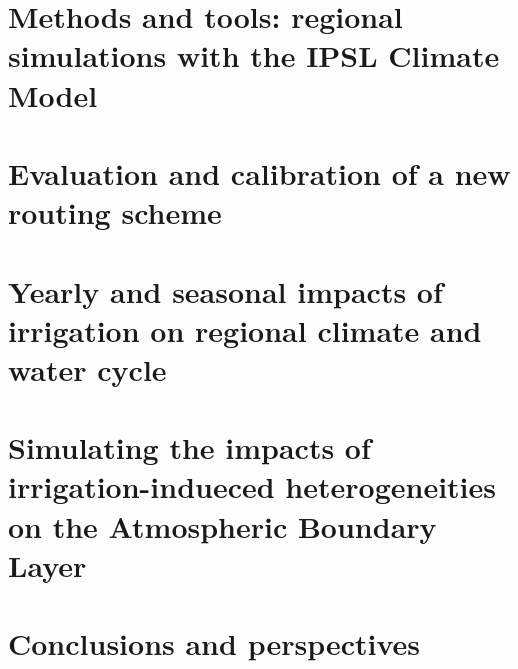 \documentclass{report}
\begin{document}
\chapter{Methods and tools: regional simulations with the IPSL Climate Model}
\minitoc


\chapter{Evaluation and calibration of a new routing scheme}
\minitoc


\chapter{Yearly and seasonal impacts of irrigation on regional climate and water cycle}
\minitoc


\chapter{Simulating the impacts of irrigation-indueced heterogeneities on the Atmospheric Boundary Layer}
\minitoc


\chapter{Conclusions and perspectives}

\newpage

% 

\printbibliography


\listoffigures
\newpage
\listoftables
\end{document}
